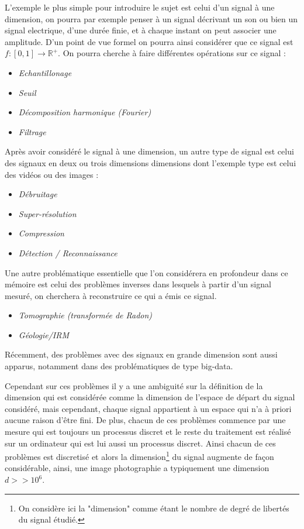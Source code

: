 \begin{exemple} L'exemple le plus simple pour introduire le sujet est celui d'un signal à une dimension, on pourra par exemple penser à un signal décrivant un son ou bien un signal electrique, d'une durée finie, et à chaque instant on peut associer une amplitude. D'un point de vue formel on pourra ainsi considérer que ce signal est $f:[0, 1] \longrightarrow \mathbb{R}^+$. On pourra cherche à faire différentes opérations sur ce signal :
	\begin{itemize}
		\item \it{Echantillonage}
		\item \it{Seuil}
		\item \it{Décomposition harmonique (Fourier)}
		\item \it{Filtrage}
	\end{itemize}
\end{exemple}
\begin{exemple}
	Après avoir considéré le signal à une dimension, un autre type de signal est celui des signaux en deux ou trois dimensions  dimensions dont l'exemple type est celui des vidéos ou des images :
	\begin{itemize}
		\item \it{Débruitage}
		\item \it{Super-résolution}
		\item \it{Compression}
		\item \it{Détection / Reconnaissance}
	\end{itemize}
\end{exemple}
\begin{exemple}
	Une autre problématique essentielle que l'on considérera en profondeur dans ce mémoire est celui des problèmes inverses dans lesquels à partir d'un signal mesuré, on cherchera à reconstruire ce qui a émis ce signal.
	\begin{itemize}
		\item \it{Tomographie (transformée de Radon)} 
		\item \it{Géologie/IRM}
	\end{itemize}  
\end{exemple}
\begin{exemple}
	Récemment, des problèmes avec des signaux en grande dimension sont aussi apparus, notamment dans des problématiques de type big-data.
\end{exemple}

Cependant sur ces problèmes il y a une ambiguité sur la définition de la dimension qui est considérée comme la dimension de l'espace de départ du signal considéré, mais cependant, chaque signal appartient à un espace qui n'a à priori aucune raison d'être fini. 
De plus, chacun de ces problèmes commence par une mesure qui est toujours un processus discret et le reste du traitement est réalisé sur un ordinateur qui est lui aussi un processus discret.
Ainsi chacun de ces problèmes est discretisé et alors la dimension\footnote{On considère ici la "dimension" comme étant le nombre de degré de libertés du signal étudié.} du signal augmente de façon considérable, ainsi, une image photographie a typiquement une dimension $d >> 10^6$.

